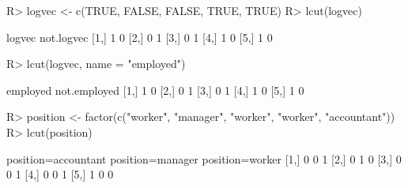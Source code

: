 \documentclass{article}\usepackage[]{graphicx}\usepackage[]{color}
\begin{document}
\begin{Schunk}
% --begin: "lcut.logical"
\begin{Sinput}
R> logvec <- c(TRUE, FALSE, FALSE, TRUE, TRUE)
R> lcut(logvec)
\end{Sinput}
\begin{Soutput}
     logvec not.logvec
[1,]      1          0
[2,]      0          1
[3,]      0          1
[4,]      1          0
[5,]      1          0
\end{Soutput}
\begin{Sinput}
R> lcut(logvec, name = "employed")
\end{Sinput}
\begin{Soutput}
     employed not.employed
[1,]        1            0
[2,]        0            1
[3,]        0            1
[4,]        1            0
[5,]        1            0
\end{Soutput}
%
% --end: "lcut.logical"
\end{Schunk}

\begin{Schunk}
% --begin: "lcut.factor"
\begin{Sinput}
R> position <- factor(c("worker", "manager", "worker", "worker", "accountant"))
R> lcut(position)
\end{Sinput}
\begin{Soutput}
     position=accountant position=manager position=worker
[1,]                   0                0               1
[2,]                   0                1               0
[3,]                   0                0               1
[4,]                   0                0               1
[5,]                   1                0               0
\end{Soutput}
%
% --end: "lcut.factor"
\end{Schunk}
\end{document}
